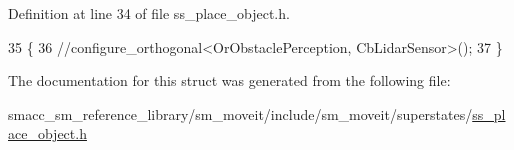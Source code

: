 Definition at line 34 of file ss\+\_\+place\+\_\+object.\+h.


\begin{DoxyCode}
35     \{
36         \textcolor{comment}{//configure\_orthogonal<OrObstaclePerception, CbLidarSensor>();}
37     \}
\end{DoxyCode}


The documentation for this struct was generated from the following file\+:\begin{DoxyCompactItemize}
\item 
smacc\+\_\+sm\+\_\+reference\+\_\+library/sm\+\_\+moveit/include/sm\+\_\+moveit/superstates/\hyperlink{include_2sm__moveit_2superstates_2ss__place__object_8h}{ss\+\_\+place\+\_\+object.\+h}\end{DoxyCompactItemize}
